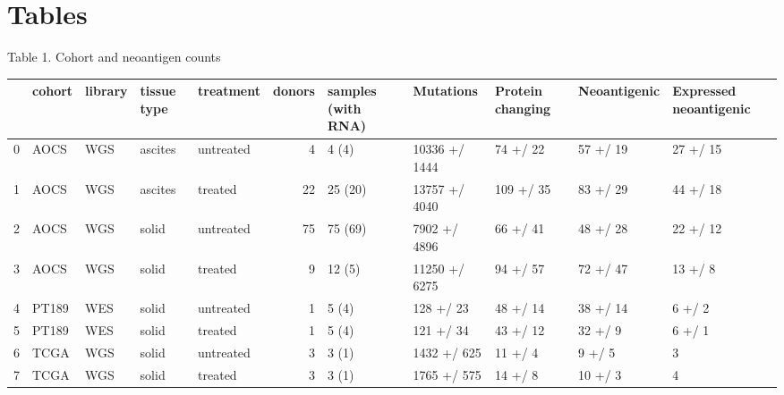 \section{Tables}

Table 1. Cohort and neoantigen counts

\begin{tabular}{lllllrlllll}
\toprule
{} & cohort & library & tissue type &  treatment &  donors & samples (with RNA) &      Mutations & Protein changing & Neoantigenic & Expressed neoantigenic \\
\midrule
0 &   AOCS &     WGS &     ascites &  untreated &       4 &              4 (4) &  10336 +/ 1444 &         74 +/ 22 &     57 +/ 19 &               27 +/ 15 \\
1 &   AOCS &     WGS &     ascites &    treated &      22 &            25 (20) &  13757 +/ 4040 &        109 +/ 35 &     83 +/ 29 &               44 +/ 18 \\
2 &   AOCS &     WGS &       solid &  untreated &      75 &            75 (69) &   7902 +/ 4896 &         66 +/ 41 &     48 +/ 28 &               22 +/ 12 \\
3 &   AOCS &     WGS &       solid &    treated &       9 &             12 (5) &  11250 +/ 6275 &         94 +/ 57 &     72 +/ 47 &                13 +/ 8 \\
4 &  PT189 &     WES &       solid &  untreated &       1 &              5 (4) &      128 +/ 23 &         48 +/ 14 &     38 +/ 14 &                 6 +/ 2 \\
5 &  PT189 &     WES &       solid &    treated &       1 &              5 (4) &      121 +/ 34 &         43 +/ 12 &      32 +/ 9 &                 6 +/ 1 \\
6 &   TCGA &     WGS &       solid &  untreated &       3 &              3 (1) &    1432 +/ 625 &          11 +/ 4 &       9 +/ 5 &                      3 \\
7 &   TCGA &     WGS &       solid &    treated &       3 &              3 (1) &    1765 +/ 575 &          14 +/ 8 &      10 +/ 3 &                      4 \\
\bottomrule
\end{tabular}